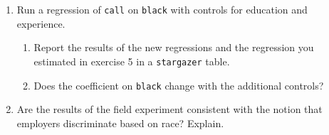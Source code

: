 \documentclass[11pt]{article}
\begin{document}
\begin{onehalfspacing}
\begin{enumerate}
\item Run a regression of \texttt{call} on \texttt{black} with controls for education and experience. 
\begin{enumerate}

	\item Report the results of the new regressions and the regression you estimated in exercise 5 in a \texttt{stargazer} table.
	\item Does the coefficient on \texttt{black} change with the additional controls? 
\end{enumerate}

\item Are the results of the field experiment consistent with the notion that employers discriminate based on race? Explain.

\end{enumerate}
\end{onehalfspacing}
\end{document}

